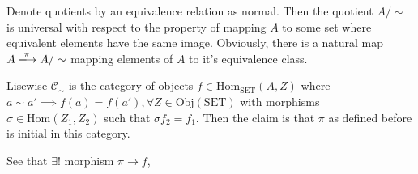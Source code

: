 \documentclass[12pt, twosided]{article}
\begin{document}
Denote quotients by an equivalence relation as normal. Then the quotient \(A / \sim\) is universal with respect to the property of mapping \(A\) to some set where equivalent elements have the same image. Obviously, there is a natural map \(A \xlongrightarrow{\pi} A / \sim\) mapping elements of \(A\) to it's equivalence class.

Lisewise \(\mathcal{C}_\sim\) is the category of objects \(f \in \mathrm{Hom}_\mathrm{SET}(A, Z)\) where \(a \sim a\prime \implies f(a) = f(a\prime), \forall Z \in \mathrm{Obj}(\mathrm{SET})\)  with morphisms \(\sigma \in \mathrm{Hom}(Z_1, Z_2)\) such that \(\sigma f_2 = f_1\). Then the claim is that \(\pi\) as defined before is initial in this category.

See that \(\exists !\) morphism \(\pi \to f\),

\begin{center}
\end{center}
\end{document}
